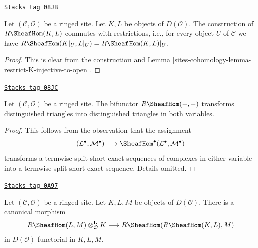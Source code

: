 \begin{lemma}
\label{sites-cohomology-lemma-restriction-RHom-to-U}
\href{https://stacks.math.columbia.edu/tag/08JB}{\texttt{Stacks tag 08JB}}

Let $(\mathcal{C}, \mathcal{O})$ be a ringed site. Let $K, L$ be objects
of $D(\mathcal{O})$. The construction of $R\SheafHom(K, L)$
commutes with restrictions, i.e.,
for every object $U$ of $\mathcal{C}$ we have
$R\SheafHom(K|_U, L|_U) = R\SheafHom(K, L)|_U$.
\end{lemma}

\begin{proof}
This is clear from the construction and
Lemma \ref{sites-cohomology-lemma-restrict-K-injective-to-open}.
\end{proof}

\begin{lemma}
\label{sites-cohomology-lemma-RHom-triangulated}
\href{https://stacks.math.columbia.edu/tag/08JC}{\texttt{Stacks tag 08JC}}

Let $(\mathcal{C}, \mathcal{O})$ be a ringed site. The bifunctor
$R\SheafHom(- , -)$ transforms distinguished triangles into
distinguished triangles in both variables.
\end{lemma}

\begin{proof}
This follows from the observation that the assignment
$$
(\mathcal{L}^\bullet, \mathcal{M}^\bullet) \longmapsto
\SheafHom^\bullet(\mathcal{L}^\bullet, \mathcal{M}^\bullet)
$$
transforms a termwise split short exact sequences of complexes in either
variable into a termwise split short exact sequence. Details omitted.
\end{proof}

\begin{lemma}
\label{sites-cohomology-lemma-internal-hom-evaluate}
\href{https://stacks.math.columbia.edu/tag/0A97}{\texttt{Stacks tag 0A97}}

Let $(\mathcal{C}, \mathcal{O})$ be a ringed site. Let $K, L, M$ be objects of
$D(\mathcal{O})$. There is a canonical morphism
$$
R\SheafHom(L, M) \otimes_\mathcal{O}^\mathbf{L} K
\longrightarrow
R\SheafHom(R\SheafHom(K, L), M)
$$
in $D(\mathcal{O})$ functorial in $K, L, M$.
\end{lemma}

